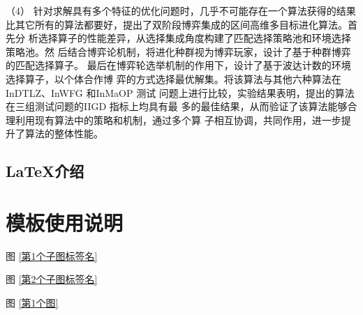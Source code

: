 （4） 针对求解具有多个特征的优化问题时，几乎不可能存在一个算法获得的结果
比其它所有的算法都要好，提出了双阶段博弈集成的区间高维多目标进化算法。首先分
析选择算子的性能差异，从选择集成角度构建了匹配选择策略池和环境选择策略池。然
后结合博弈论机制，将进化种群视为博弈玩家，设计了基于种群博弈的匹配选择算子。
最后在博弈轮选举机制的作用下，设计了基于波达计数的环境选择算子，以个体合作博
弈的方式选择最优解集。将该算法与其他六种算法在InDTLZ、InWFG 和InMaOP 测试
问题上进行比较，实验结果表明，提出的算法在三组测试问题的IIGD 指标上均具有最
多的最佳结果，从而验证了该算法能够合理利用现有算法中的策略和机制，通过多个算
子相互协调，共同作用，进一步提升了算法的整体性能。
\section{\LaTeX 介绍}
\zhlipsum[1-3]
\chapter{模板使用说明}
图 \ref{第1个子图标签名}

图 \ref{第2个子图标签名}

图 \ref{第1个图}

